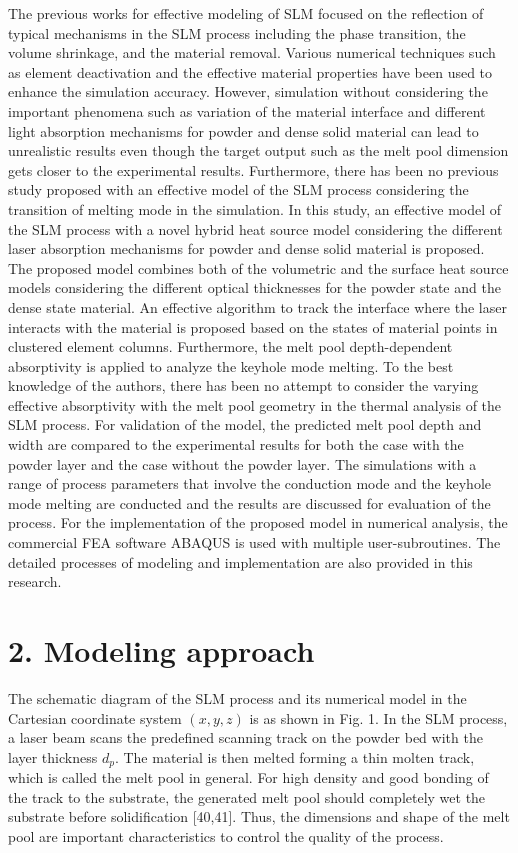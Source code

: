 \documentclass[10pt]{article}
\begin{document}
The previous works for effective modeling of SLM focused on the reflection of typical mechanisms in the SLM process including the phase transition, the volume shrinkage, and the material removal. Various numerical techniques such as element deactivation and the effective material properties have been used to enhance the simulation accuracy. However, simulation without considering the important phenomena such as variation of the material interface and different light absorption mechanisms for powder and dense solid material can lead to unrealistic results even though the target output such as the melt pool dimension gets closer to the experimental results. Furthermore, there has been no previous study proposed with an effective model of the SLM process considering the transition of melting mode in the simulation. In this study, an effective model of the SLM process with a novel hybrid heat source model considering the different laser absorption mechanisms for powder and dense solid material is proposed. The proposed model combines both of the volumetric and the surface heat source models considering the different optical thicknesses for the powder state and the dense state material. An effective algorithm to track the interface where the laser interacts with the material is proposed based on the states of material points in clustered element columns. Furthermore, the melt pool depth-dependent absorptivity is applied to analyze the keyhole mode melting. To the best knowledge of the authors, there has been no attempt to consider the varying effective absorptivity with the melt pool geometry in the thermal analysis of the SLM process. For validation of the model, the predicted melt pool depth and width are compared to the experimental results for both the case with the powder layer and the case without the powder layer. The simulations with a range of process parameters that involve the conduction mode and the keyhole mode melting are conducted and the results are discussed for evaluation of the process. For the implementation of the proposed model in numerical analysis, the commercial FEA software ABAQUS is used with multiple user-subroutines. The detailed processes of modeling and implementation are also provided in this research.

\section*{2. Modeling approach}
The schematic diagram of the SLM process and its numerical model in the Cartesian coordinate system $(x, y, z)$ is as shown in Fig. 1. In the SLM process, a laser beam scans the predefined scanning track on the powder bed with the layer thickness $d_{p}$. The material is then melted forming a thin molten track, which is called the melt pool in general. For high density and good bonding of the track to the substrate, the generated melt pool should completely wet the substrate before solidification [40,41]. Thus, the dimensions and shape of the melt pool are important characteristics to control the quality of the process.
\end{document}
